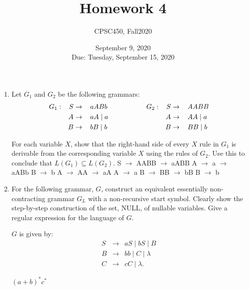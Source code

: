 \documentclass{article}
\title{Homework 4}
\author{CPSC450, Fall2020}
\date{September 9, 2020\\
Due: Tuesday, September 15, 2020}
\begin{document}
\maketitle

\begin{enumerate}

\item Let $G_1$ and $G_2$ be the following grammars:
\begin{alignat*}{7}
G_1&:&  S &\rightarrow&\,& aABb &\hspace{0.5in} & &G_2&:& S &\rightarrow&\,& AABB\\
   &&  A &\rightarrow&\,& aA \mid a & & &&& A &\rightarrow&\,& AA \mid a\\
   &&  B &\rightarrow&\,& bB \mid b & & &&& B &\rightarrow&\,& BB \mid b
\end{alignat*}

For each variable $X$, show that the right-hand side of every $X$ rule
in $G_1$ is derivable from the corresponding variable $X$ using the
rules of $G_2$. Use this to conclude that $L(G_1) \subseteq L(G_2)$.
\newline S $\rightarrow$ AABB
\newline $\rightarrow$ aABB A $\rightarrow$ a
\newline $\rightarrow$ aABb B $\rightarrow$ b
\newline
\newline A $\rightarrow$ AA
\newline $\rightarrow$ aA A $\rightarrow$ a
\newline
\newline B $\rightarrow$ BB
\newline $\rightarrow$ bB B $\rightarrow$ b

\item For the following grammar, $G$, construct an equivalent
  essentially non-contracting grammar $G_L$ with a non-recursive start
  symbol. Clearly show the step-by-step construction of
  the set, NULL, of nullable variables. Give a regular expression for
  the language of $G$.

 $G$ is given by:
     \begin{eqnarray*}
      S &\rightarrow& aS \mid bS \mid B\\
      B &\rightarrow& bb \mid C \mid \lambda\\
      C &\rightarrow& cC \mid \lambda.
    \end{eqnarray*}
    
\newline $(a+b)^*c^*$


\end{enumerate}
\end{document}
